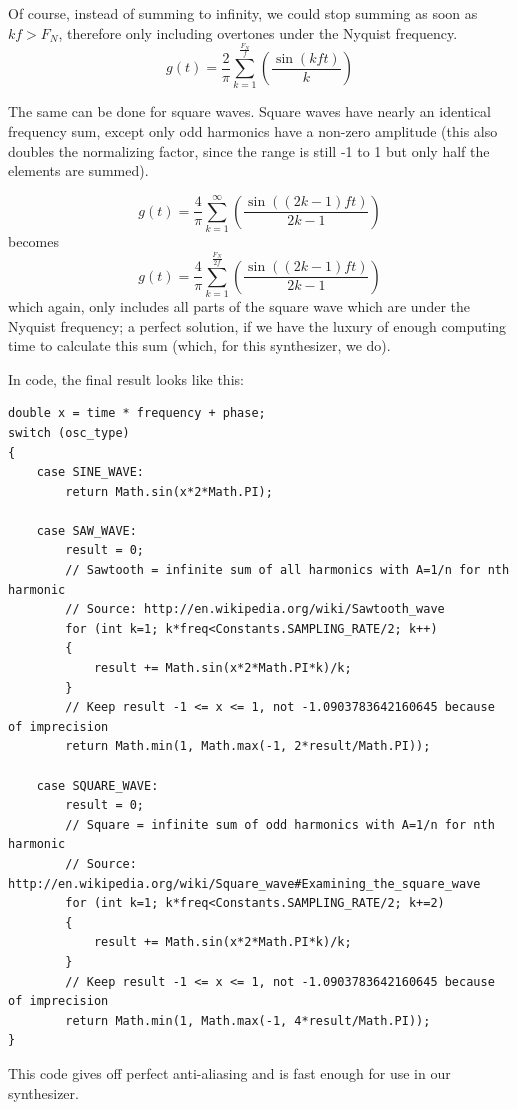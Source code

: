 \documentclass[11pt,a4paper]{article}
\begin{document}
Of course, instead of summing to infinity, we could stop summing as soon as \(kf > F_N\), therefore only including overtones under the Nyquist frequency.
\begin{equation}
g(t) = \frac{2}{\pi}\sum\limits_{k=1}^\frac{F_N}{f}{\left(\frac{\sin(kft)}{k}\right)}
\end{equation}

The same can be done for square waves. Square waves have nearly an identical frequency sum, except only odd harmonics have a non-zero amplitude (this also doubles the normalizing factor, since the range is still -1 to 1 but only half the elements are summed).~\cite{WolframSquare}

\begin{equation}
g(t) = \frac{4}{\pi}\sum\limits_{k=1}^\infty{\left(\frac{\sin((2k-1)ft)}{2k-1}\right)}
\end{equation}
becomes
\begin{equation}
g(t) = \frac{4}{\pi}\sum\limits_{k=1}^\frac{F_N}{2f}{\left(\frac{\sin((2k-1)ft)}{2k-1}\right)}
\end{equation}
which again, only includes all parts of the square wave which are under the Nyquist frequency; a perfect solution, if we have the luxury of enough computing time to calculate this sum (which, for this synthesizer, we do).

In code, the final result looks like this:
\\\begin{minipage}{\linewidth}
\begin{lstlisting}
double x = time * frequency + phase;
switch (osc_type)
{
	case SINE_WAVE:
		return Math.sin(x*2*Math.PI);
	
	case SAW_WAVE:
		result = 0;
		// Sawtooth = infinite sum of all harmonics with A=1/n for nth harmonic
		// Source: http://en.wikipedia.org/wiki/Sawtooth_wave
		for (int k=1; k*freq<Constants.SAMPLING_RATE/2; k++)
		{
			result += Math.sin(x*2*Math.PI*k)/k;
		}
		// Keep result -1 <= x <= 1, not -1.0903783642160645 because of imprecision
		return Math.min(1, Math.max(-1, 2*result/Math.PI));
		
	case SQUARE_WAVE:
		result = 0;
		// Square = infinite sum of odd harmonics with A=1/n for nth harmonic
		// Source: http://en.wikipedia.org/wiki/Square_wave#Examining_the_square_wave
		for (int k=1; k*freq<Constants.SAMPLING_RATE/2; k+=2)
		{
			result += Math.sin(x*2*Math.PI*k)/k;
		}
		// Keep result -1 <= x <= 1, not -1.0903783642160645 because of imprecision
		return Math.min(1, Math.max(-1, 4*result/Math.PI));
}
\end{lstlisting}
\end{minipage}
This code gives off perfect anti-aliasing and is fast enough for use in our synthesizer.
\end{document}
